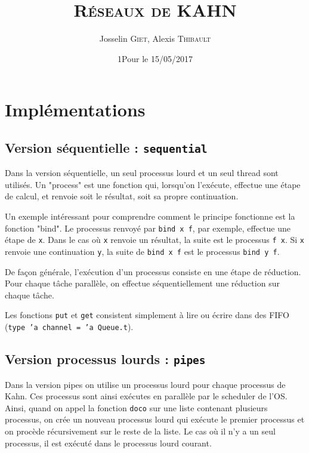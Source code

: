 \documentclass[11pt,a4paper]{article}
\title{\textsc{Réseaux de KAHN}}   %
\author{Josselin \textsc{Giet}, Alexis \textsc{Thibault}}  %
\date{1Pour le 15/05/2017}    %
\renewcommand{\tt}[1]{\texttt{#1}}
\begin{document}
\maketitle

\tableofcontents





\section{Implémentations}


\subsection{Version séquentielle : \texttt{sequential}}

Dans la version séquentielle, un seul processus lourd et un seul thread sont
utilisés. Un "process" est une fonction qui, lorsqu'on l'exécute, effectue une
étape de calcul, et renvoie soit le résultat, soit sa propre continuation.

Un exemple intéressant pour comprendre comment le principe fonctionne est la
fonction "bind". Le processus renvoyé par \texttt{bind x f}, par exemple, effectue une
étape de \tt{x}. Dans le cas où \tt{x} renvoie un résultat, la suite est le processus
\tt{f x}. Si \tt{x} renvoie une continuation \tt{y}, la suite de \tt{bind x f} est le processus
\tt{bind y f}.

De façon générale, l'exécution d'un processus consiste en une étape de
réduction. Pour chaque tâche parallèle, on effectue séquentiellement une
réduction sur chaque tâche.

Les fonctions \tt{put} et \tt{get} consistent simplement à lire ou écrire dans des
FIFO (\tt{type 'a channel = 'a Queue.t}).


\subsection{Version processus lourds : \texttt{pipes}}

Dans la version pipes on utilise un processus lourd pour chaque processus
de Kahn. Ces processus sont ainsi exécutes en parallèle par le scheduler
de l'OS. Ainsi, quand on appel la fonction \tt{doco} sur une liste contenant
plusieurs processus, on crée un nouveau processus lourd qui exécute le
premier processus et on procède récursivement sur le reste de la liste.
Le cas où il n'y a un seul processus, il est exécuté dans le processus
lourd courant.
\end{document}
